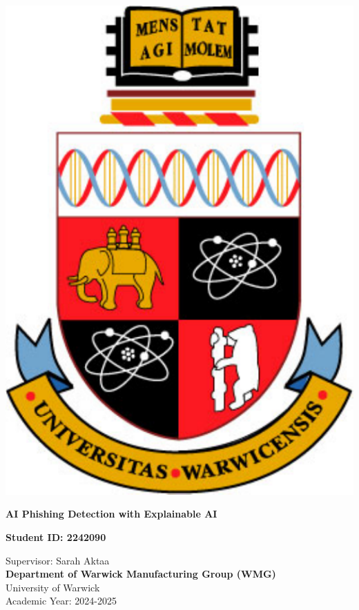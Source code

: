\thispagestyle{empty}

\begin{spacing}{2}
    \begin{center}

        \includegraphics[scale=0.45]{preamble/warwick-crest.pdf}
        \vspace{10mm}

        \textbf{\LARGE AI Phishing Detection with Explainable AI}
        \vspace{20mm}

        {\large \textbf{Student ID: 2242090}}
        \vspace{20mm}

        {\large Supervisor: Sarah Aktaa}\\
        \textbf{\large Department of Warwick Manufacturing Group (WMG)}\\
        {\large University of Warwick}\\
        {\large Academic Year: 2024-2025}

    \end{center}
\end{spacing}

